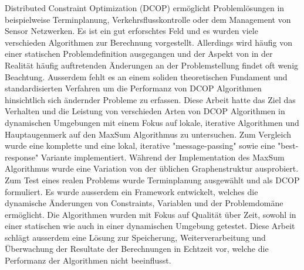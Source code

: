 \begin{zusammenfassung}
Distributed Constraint Optimization (DCOP) erm{\"o}glicht Probleml{\"o}sungen in beispielweise Terminplanung, Verkehrsflusskontrolle oder dem Management von Sensor Netzwerken. Es ist ein gut erforschtes Feld und es wurden viele verschieden Algorithmen zur Berechnung vorgestellt. Allerdings wird h{\"a}ufig von einer statischen Problemdefinition ausgegangen und der Aspekt von in der Realit{\"a}t h{\"a}ufig auftretenden {\"A}nderungen an der Problemstellung findet oft wenig Beachtung. Ausserdem fehlt es an einem soliden theoretischen Fundament und standardisierten Verfahren um die Performanz von DCOP Algorithmen hinsichtlich sich {\"a}ndernder Probleme zu erfassen. Diese Arbeit hatte das Ziel das Verhalten und die Leistung von verschieden Arten von DCOP Algorithmen in dynamischen Umgebungen mit einem Fokus auf lokale, iterative Algorithmen und Hauptaugenmerk auf den MaxSum Algorithmus zu untersuchen. Zum Vergleich wurde eine komplette und eine lokal, iterative "message-passing" sowie eine "best-response" Variante implementiert. W{\"a}hrend der Implementation des MaxSum Algorithmus wurde eine Variation von der üblichen Graphenstruktur ausprobiert. Zum Test eines realen Problems wurde Terminplanung ausgew{\"a}hlt und als DCOP formuliert. Es wurde ausserdem ein Framework entwickelt, welches die dynamische {\"A}nderungen von Constraints, Variablen und der Problemdom{\"a}ne erm{\"o}glicht. Die Algorithmen wurden mit Fokus auf Qualit{\"a}t {\"u}ber Zeit, sowohl in einer statischen wie auch in einer dynamischen Umgebung getestet. Diese Arbeit schl{\"a}gt ausserdem eine L{\"o}sung zur Speicherung, Weiterverarbeitung und {\"U}berwachung der Resultate der Berechnungen in Echtzeit vor, welche die Performanz der Algorithmen nicht beeinflusst.
\end{zusammenfassung}


